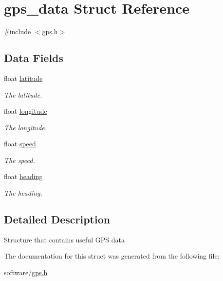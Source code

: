 \hypertarget{structgps__data}{}\section{gps\+\_\+data Struct Reference}
\label{structgps__data}


{\ttfamily \#include $<$gps.\+h$>$}

\subsection*{Data Fields}
\begin{DoxyCompactItemize}
\item 
float \hyperlink{structgps__data_ad9e643bc6bd5a62b9b5011cf1c93629e}{latitude}\hypertarget{structgps__data_ad9e643bc6bd5a62b9b5011cf1c93629e}{}\label{structgps__data_ad9e643bc6bd5a62b9b5011cf1c93629e}

\begin{DoxyCompactList}\small\item\em The latitude. \end{DoxyCompactList}\item 
float \hyperlink{structgps__data_a006303577d6adb772761727538b74f80}{longitude}\hypertarget{structgps__data_a006303577d6adb772761727538b74f80}{}\label{structgps__data_a006303577d6adb772761727538b74f80}

\begin{DoxyCompactList}\small\item\em The longitude. \end{DoxyCompactList}\item 
float \hyperlink{structgps__data_a7f7e4724cf57d59513b39c5ecc81adc8}{speed}\hypertarget{structgps__data_a7f7e4724cf57d59513b39c5ecc81adc8}{}\label{structgps__data_a7f7e4724cf57d59513b39c5ecc81adc8}

\begin{DoxyCompactList}\small\item\em The speed. \end{DoxyCompactList}\item 
float \hyperlink{structgps__data_ac5682e48513a771560df50e3b213e61a}{heading}\hypertarget{structgps__data_ac5682e48513a771560df50e3b213e61a}{}\label{structgps__data_ac5682e48513a771560df50e3b213e61a}

\begin{DoxyCompactList}\small\item\em The heading. \end{DoxyCompactList}\end{DoxyCompactItemize}


\subsection{Detailed Description}
Structure that contains useful G\+PS data 

The documentation for this struct was generated from the following file\+:\begin{DoxyCompactItemize}
\item 
software/\hyperlink{gps_8h}{gps.\+h}\end{DoxyCompactItemize}
